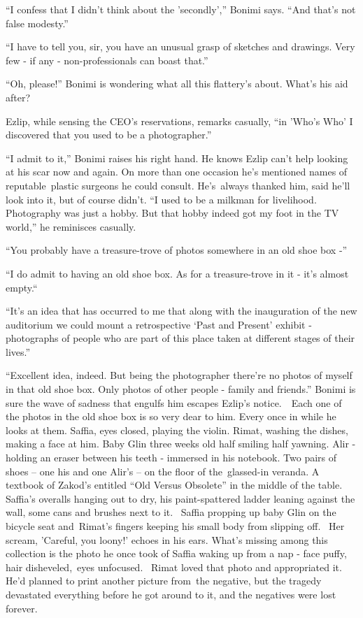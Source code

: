 \documentclass[twoside,11pt]{book}
\begin{document}
``I confess that I didn't think about the 'secondly','' Bonimi says. ``And that's
not false modesty.''

``I have to tell you, sir, you have an unusual grasp of sketches and drawings. Very few - if any -
non-professionals can boast that.'' 

``Oh, please!'' Bonimi is wondering what all this flattery's about. What's his aid after? 

Ezlip, while sensing the CEO's reservations, remarks casually, ``in 'Who's Who' I discovered that you used
to be a photographer.''

``I admit to it,'' Bonimi raises his right hand. He knows Ezlip can't help looking at his scar
now and again. On more than one occasion he's mentioned names of reputable{\ }plastic surgeons he could
consult. He's\ always thanked him, said he'll look into it, but of course didn't. ``I used to be a milkman
for livelihood. Photography was just a hobby. But that hobby indeed got my foot in the TV world,'' he
reminisces casually.\ 

``You probably have a treasure-trove of photos somewhere in an old shoe box -'' 

``I do admit to having an old shoe box. As for a treasure-trove in it {}- it's almost
empty.``~ 

``It's an idea that has occurred to me that along with the inauguration of the new auditorium we could
mount a retrospective `Past and Present' exhibit {}- photographs of people who are part of this place taken at
different stages of their lives.'' 

``Excellent idea, indeed. But being the photographer there're no photos of myself in that old shoe box.
Only photos of other people - family and friends.'' Bonimi is sure the wave of sadness that engulfs him
escapes Ezlip's notice.\ \ Each one of the photos in the old shoe box is so very dear to him. Every once in while he
looks at them. Saffia, eyes closed, playing the violin. Rimat, washing the dishes, making a face at him. Baby Glin
three weeks old half smiling half yawning. Alir - holding an eraser between his teeth - immersed in his notebook. Two
pairs of shoes -- one his and one Alir's -- on the floor of the\ glassed-in veranda. A textbook of Zakod's entitled
``Old Versus Obsolete'' in the middle of the table. Saffia's overalls hanging out to dry, his
paint-spattered ladder leaning against the wall, some cans and brushes next to it. ~Saffia propping up baby Glin on the
bicycle seat and~Rimat's fingers keeping his small body from slipping off. ~Her scream, 'Careful, you loony!' echoes in
his ears. What's missing among this collection is the photo he once took of Saffia waking up from a nap - face puffy,
hair disheveled,{\ }{eyes
unfocused.} ~Rimat loved that photo and appropriated it. He'd planned to print another picture from~the negative, but
the tragedy devastated everything before he got around to it, and the negatives were lost forever.
\end{document}
